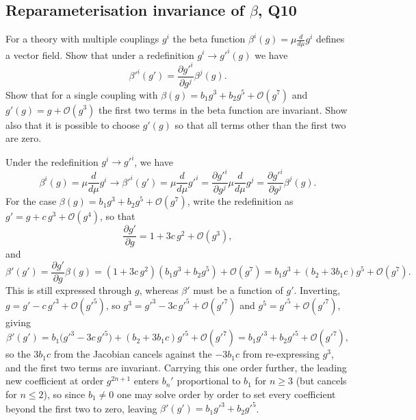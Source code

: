 \subsection{Reparameterisation invariance of $\beta$, Q10}
For a theory with multiple couplings $g^i$ the beta function $\beta^i(g) = \mu\frac{d}{d\mu}g^i$ defines a vector field. Show that under a redefinition $g^i\to g'^i(g)$ we have
\begin{equation}
    \beta'^i(g') = \frac{\partial g'^i}{\partial g^j}\beta^j(g).
\end{equation}
Show that for a single coupling with $\beta(g) = b_1 g^3 + b_2 g^5 + \mathcal{O}(g^7)$ and $g'(g) = g + \mathcal{O}(g^3)$ the first two terms in the beta function are invariant. Show also that it is possible to choose $g'(g)$ so that all terms other than the first two are zero.

\begin{solution}
Under the redefinition $g^i \to g'^i$, we have
    \begin{equation}
        \beta^i(g) = \mu \frac{d}{d\mu}g^i \to  \beta'^i(g') = \mu \frac{d}{d\mu}g'^i = \frac{\partial g'^i}{\partial g^j}\mu \frac{d}{d\mu}g^j =  \frac{\partial g'^i}{\partial g^j}\beta^j(g).
    \end{equation}
    For the case $\beta(g) = b_1 g^3 + b_2 g^5 + \mathcal{O}(g^7)$, write the redefinition as $g' = g + c\,g^3 + \mathcal{O}(g^4)$, so that
    \begin{equation}
        \frac{\partial g'}{\partial g} =1+3c\,g^2+\mathcal{O}(g^3),
    \end{equation}
    and
    \begin{equation}
        \beta'(g') = \frac{\partial g'}{\partial g}\beta(g) = (1+3c\,g^2)(b_1 g^3 + b_2 g^5) + \mathcal{O}(g^7) = b_1g^3 +(b_2+3b_1 c)g^5+\mathcal{O}(g^7).
    \end{equation}
    This is still expressed through $g$, whereas $\beta'$ must be a function of $g'$. Inverting, $g = g' - c\,g'^3 + \mathcal{O}(g'^5)$, so $g^3 = g'^3 - 3c\,g'^5+\mathcal{O}(g'^7)$ and $g^5 = g'^5 + \mathcal{O}(g'^7)$, giving
    \begin{equation}
        \beta'(g') = b_1\big(g'^3 - 3c\,g'^5\big) + (b_2+3b_1 c)g'^5+\mathcal{O}(g'^7) = b_1 g'^3 + b_2 g'^5 + \mathcal{O}(g'^7),
    \end{equation}
    so the $3b_1 c$ from the Jacobian cancels against the $-3b_1 c$ from re-expressing $g^3$, and the first two terms are invariant. Carrying this one order further, the leading new coefficient at order $g^{2n+1}$ enters $b_n'$ proportional to $b_1$ for $n\geq 3$ (but cancels for $n\leq 2$), so since $b_1\neq 0$ one may solve order by order to set every coefficient beyond the first two to zero, leaving $\beta'(g') = b_1 g'^3 + b_2 g'^5$.
\end{solution}
